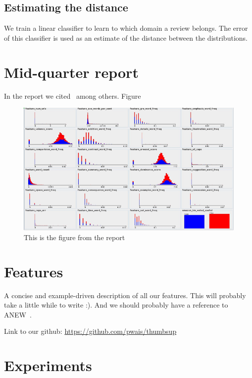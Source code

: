 \documentclass[letterpaper]{article}
\begin{document}
\subsection{Estimating the distance}
\label{sec:estimating-distance}

We train a linear classifier to learn to which domain a review
belongs. The error of this classifier is used as an estimate of the
distance between the distributions.

\section{Mid-quarter report}
\label{sec:mid-quarter-report}

In the report we cited~\cite{citeulike:352583} among others. Figure~

\begin{figure}[h]
  \centering
  \includegraphics[scale=.5]{features_distributions}
  \caption{This is the figure from the report}
  \label{fig:dist}
\end{figure}

\section{Features}
\label{sec:features}

A concise and example-driven description of all our features.  This
will probably take a little while to write :). And we should probably
have a reference to ANEW~\cite{DoddsANEWPaper}.

Link to our github:
\url{https://github.com/pwais/thumbsup}

\section{Experiments}
\label{sec:experiments}
\end{document}
